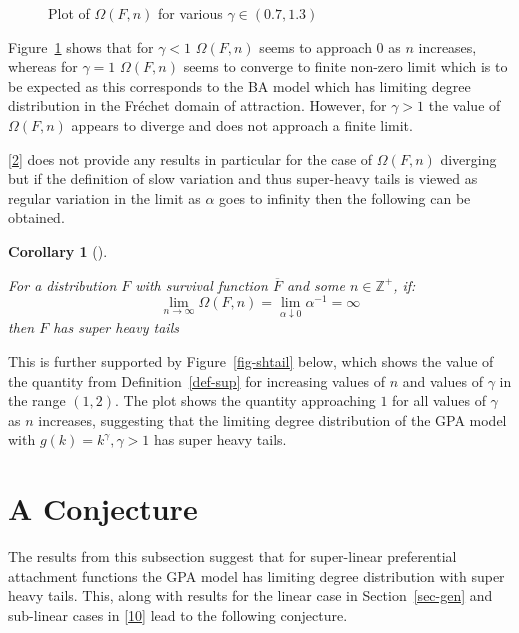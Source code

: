 \documentclass[
  10pt,
  a4paper,
]{scrreprt}
\theoremstyle{plain}
\newtheorem{corollary}{Corollary}[section]
\theoremstyle{plain}
\theoremstyle{definition}
\theoremstyle{plain}
\theoremstyle{remark}
\begin{document}
{\begin{figure}[H]
{}

\caption{\label{fig-omega}Plot of \(\Omega(F,n)\) for various
\(\gamma \in (0.7,1.3)\)}

\end{figure}

Figure~\ref{fig-omega} shows that for \(\gamma<1\) \(\Omega(F,n)\) seems
to approach 0 as \(n\) increases, whereas for \(\gamma=1\)
\(\Omega(F,n)\) seems to converge to finite non-zero limit which is to
be expected as this corresponds to the BA model which has limiting
degree distribution in the Fréchet domain of attraction. However, for
\(\gamma>1\) the value of \(\Omega(F,n)\) appears to diverge and does
not approach a finite limit.

{[}\protect\hyperlink{ref-shimura12}{2}{]} does not provide any results
in particular for the case of \(\Omega(F,n)\) diverging but if the
definition of slow variation and thus super-heavy tails is viewed as
regular variation in the limit as \(\alpha\) goes to infinity then the
following can be obtained.

\begin{corollary}[]\protect\hypertarget{cor-omg}{}\label{cor-omg}

For a distribution \(F\) with survival function \(\overline F\) and some
\(n\in\mathbb Z^+\), if: \[
\lim_{n\rightarrow\infty} \Omega(F,n) = \lim_{\alpha\downarrow0} \alpha^{-1} = \infty
\] then \(F\) has super heavy tails

\end{corollary}

This is further supported by Figure~\ref{fig-shtail} below, which shows
the value of the quantity from Definition~\ref{def-sup} for increasing
values of \(n\) and values of \(\gamma\) in the range \((1,2)\). The
plot shows the quantity approaching \(1\) for all values of \(\gamma\)
as \(n\) increases, suggesting that the limiting degree distribution of
the GPA model with \(g(k) = k^\gamma,\gamma>1\) has super heavy tails.

\hypertarget{a-conjecture}{%
\section{A Conjecture}\label{a-conjecture}}

The results from this subsection suggest that for super-linear
preferential attachment functions the GPA model has limiting degree
distribution with super heavy tails. This, along with results for the
linear case in Section~\ref{sec-gen} and sub-linear cases in
{[}\protect\hyperlink{ref-barabasibook}{10}{]} lead to the following
conjecture.

}
\end{document}
